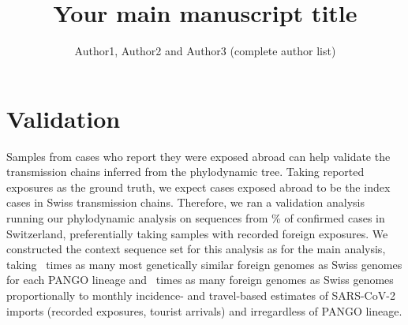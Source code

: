 \documentclass[9pt,twoside,lineno]{pnas-new}
\title{Your main manuscript title}
\author{Author1, Author2 and Author3 (complete author list)}
\begin{document}
\instructionspage  

\maketitle

\SItext


\section{Validation}
Samples from cases who report they were exposed abroad can help validate the transmission chains inferred from the phylodynamic tree. Taking reported exposures as the ground truth, we expect cases exposed abroad to be the index cases in Swiss transmission chains. Therefore, we ran a validation analysis running our phylodynamic analysis on sequences from \maxsamplingpercentval\% of confirmed cases in Switzerland, preferentially taking samples with recorded foreign exposures. We constructed the context sequence set for this analysis as for the main analysis, taking \gensimscalefactorval\ times as many most genetically similar foreign genomes as Swiss genomes for each PANGO lineage and \travelcontextscalefactorval\ times as many foreign genomes as Swiss genomes proportionally to monthly incidence- and travel-based estimates of SARS-CoV-2 imports (recorded exposures, tourist arrivals) and irregardless of PANGO lineage.
\end{document}

